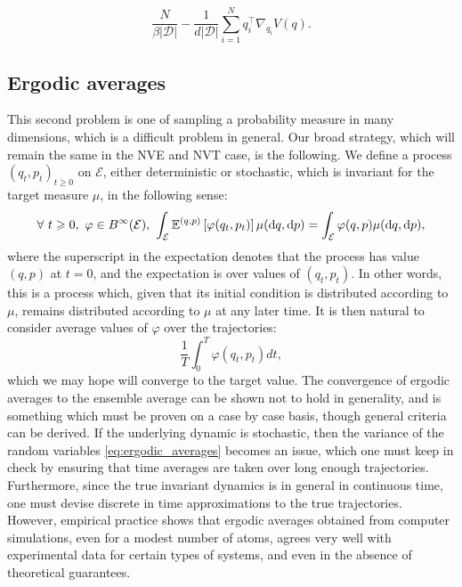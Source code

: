 $$\frac{N}{\beta |\mathcal D|}- \frac{1}{d|\mathcal D|}\sum_{i=1}^N q_i^\intercal\nabla_{q_i}V(q).$$
\subsection{Ergodic averages}

This second problem is one of sampling a probability measure in many dimensions, which is a difficult problem in general. Our broad strategy, which will remain the same in the NVE and NVT case, is the following.
We define a process $(q_t,p_t)_{t\geq 0}$ on $\mathcal E$, either deterministic or stochastic, which is invariant for the target measure $\mu$, in the following sense: 
\begin{equation}
    \label{eq:invariant_measure}
    \forall \ t\geq 0,\ \varphi \in B^\infty(\mathcal E),\ \int_{\mathcal E}\E^{(q,p)}\left[ \varphi(q_t,p_t)\right]\mu(\mathrm{d}q,\mathrm{d}p)=\int_{\mathcal E}\varphi(q,p)\mu(\mathrm{d}q,\mathrm{d}p),
\end{equation}
where the superscript in the expectation denotes that the process has value $(q,p)$ at $t=0$, and the expectation is over values of $(q_t,p_t)$. In other words, this is a process which, given that its initial condition is distributed according to $\mu$, remains distributed according to $\mu$ at any later time. It is then natural to consider average values of $\varphi$ over the trajectories:
\begin{equation}
\label{eq:ergodic_averages}
 \frac{1}{T}\int_{0}^T \varphi(q_t,p_t)dt,
\end{equation}
which we may hope will converge to the target value. The convergence of ergodic averages to the ensemble average can be shown not to hold in generality, and is something which must be proven on a case by case basis, though general criteria can be derived.
If the underlying dynamic is stochastic, then the variance of the random variables \eqref{eq:ergodic_averages} becomes an issue, which one must keep in check by ensuring that time averages are taken over long enough trajectories. 
Furthermore, since the true invariant dynamics is in general in continuous time, one must devise discrete in time approximations to the true trajectories.
However, empirical practice shows that ergodic averages obtained from computer simulations, even for a modest number of atoms, agrees very well with experimental data for certain types of systems, and even in the absence of theoretical guarantees.

